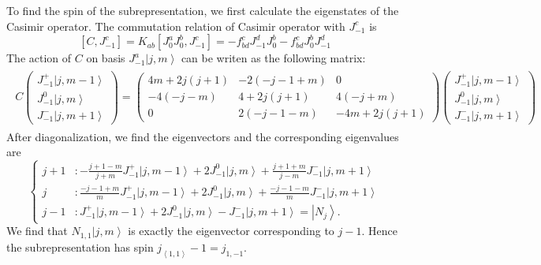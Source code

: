 \documentclass[10pt,a4paper]{article}
\numberwithin{equation}{section}
\newcommand{\ket}[1]{\left| #1 \right\rangle}
\newcommand{\vev}[1]{\left\langle #1 \right\rangle}
\begin{document}
To find the spin of the subrepresentation, we first calculate the eigenstates of the Casimir operator.
The commutation relation of Casimir operator with $J^{c}_{-1}$ is 
\begin{equation}
        \left[C,J^{c}_{-1}\right] = K_{ab}\left[J^{a}_{0}J^{b}_{0},J^{c}_{-1}\right]
        = -f^{c}_{bd} J^{d}_{-1}J^{b}_{0} - f^{c}_{bd}J^{b}_{0}J^{d}_{-1}
\end{equation}
The action of $C$ on basis $J^{a}_{-1} \ket{j,m}$ can be writen as the following matrix:
\begin{eqnarray}
    \begin{aligned}
        C 
    \begin{pmatrix}
    J^{+}_{-1} \ket{j,m-1}\\
    J^{0}_{-1} \ket{j,m}\\
    J^{-}_{-1} \ket{j,m+1}
    \end{pmatrix}
    = \begin{pmatrix}
        4m+2j(j+1) & -2 (-j-1+m) & 0\\
        -4 (-j-m) & 4 + 2j(j+1) & 4(-j+m)\\
        0 & 2 (-j-1-m)& -4m + 2j(j+1)
    \end{pmatrix}
    \begin{pmatrix}
        J^{+}_{-1} \ket{j,m-1}\\
        J^{0}_{-1} \ket{j,m}\\
        J^{-}_{-1} \ket{j,m+1}
    \end{pmatrix}
    \end{aligned}
\end{eqnarray}
After diagonalization, we find the eigenvectors and the corresponding eigenvalues are 
\begin{equation}
    \left\{
        \begin{aligned}
            j+1 &: -\frac{j+1-m}{j+m} J^{+}_{-1} \ket{j,m-1} + 2 J^{0}_{-1} \ket{j,m} + \frac{j+1+m}{j-m} J^{-}_{-1} \ket{j,m+1}\\
            j &: \frac{-j-1+m}{m} J^{+}_{-1} \ket{j,m-1} + 2 J^{0}_{-1} \ket{j,m} + \frac{-j-1-m}{m} J^{-}_{-1} \ket{j,m+1}\\
            j-1 &: J^{+}_{-1} \ket{j,m-1} + 2 J^{0}_{-1} \ket{j,m} - J^{-}_{-1} \ket{j,m+1} = \ket{N_{j}}.
        \end{aligned}
    \right.
\end{equation}
We find that $N_{1,1}\ket{j,m}$ is exactly the eigenvector corresponding to $j-1$. Hence the subrepresentation has spin $j_{\vev{1,1}}-1 = j_{1,-1}$.
\end{document}
